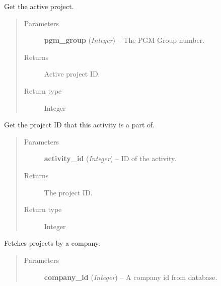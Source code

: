 \documentclass[letterpaper,10pt,english]{sphinxmanual}
\begin{document}

\begin{fulllineitems}
\label{controller:controller.project.get_active_project}
Get the active project.
\begin{quote}\begin{description}
\item[{Parameters}] \leavevmode
\textbf{pgm\_group} (\emph{Integer}) -- The PGM Group number.

\item[{Returns}] \leavevmode
Active project ID.

\item[{Return type}] \leavevmode
Integer

\end{description}\end{quote}

\end{fulllineitems}


\begin{fulllineitems}
\label{controller:controller.project.get_project_id_by_activity}
Get the project ID that this activity is a part of.
\begin{quote}\begin{description}
\item[{Parameters}] \leavevmode
\textbf{activity\_id} (\emph{Integer}) -- ID of the activity.

\item[{Returns}] \leavevmode
The project ID.

\item[{Return type}] \leavevmode
Integer

\end{description}\end{quote}

\end{fulllineitems}


\begin{fulllineitems}
\label{controller:controller.project.get_projects_by_company}
Fetches projects by a company.
\begin{quote}\begin{description}
\item[{Parameters}] \leavevmode
\textbf{company\_id} (\emph{Integer}) -- A company id from database.

\end{description}\end{quote}

\end{fulllineitems}
\end{document}
